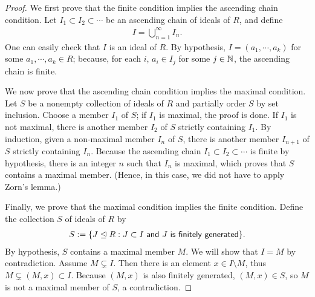 \begin{proof}
    We first prove that the finite condition implies the ascending chain condition.
    Let $I_1\subset I_2\subset\cdots$ be an ascending chain of ideals of $R$, and define
    \begin{align*}
        I=\bigcup_{n=1}^\infty I_n.
    \end{align*}
    One can easily check that $I$ is an ideal of $R$.
    By hypothesis, $I=(a_1, \cdots, a_k)$ for some $a_1, \cdots, a_k\in R$; because, for each $i$, $a_i\in I_j$ for some $j\in{\mathbb{N}}$, the ascending chain is finite.

    We now prove that the ascending chain condition implies the maximal condition.
    Let $S$ be a nonempty collection of ideals of $R$ and partially order $S$ by set inclusion.
    Choose a member $I_1$ of $S$; if $I_1$ is maximal, the proof is done.
    If $I_1$ is not maximal, there is another member $I_2$ of $S$ strictly containing $I_1$.
    By induction, given a non-maximal member $I_n$ of $S$, there is another member $I_{n+1}$ of $S$ strictly containing $I_n$.
    Because the ascending chain $I_1\subset I_2\subset\cdots$ is finite by hypothesis, there is an integer $n$ such that $I_n$ is maximal, which proves that $S$ contains a maximal member.
    (Hence, in this case, we did not have to apply Zorn's lemma.)

    Finally, we prove that the maximal condition implies the finite condition.
    Define the collection $S$ of ideals of $R$ by
    \begin{align*}
        S:=\{J\trianglelefteq R: J\subset I\textsf{ and }J\textsf{ is finitely generated}\}.
    \end{align*}
    By hypothesis, $S$ contains a maximal member $M$.
    We will show that $I=M$ by contradiction.
    Assume $M\subsetneq I$.
    Then there is an element $x\in I\setminus M$, thus $M\subsetneq (M, x)\subset I$.
    Because $(M, x)$ is also finitely generated, $(M, x)\in S$, so $M$ is not a maximal member of $S$, a contradiction.
\end{proof}